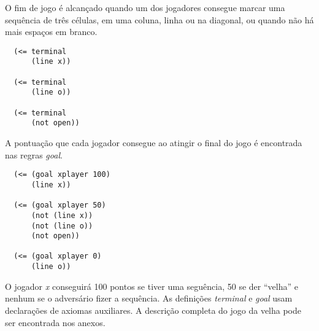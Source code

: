 O fim de jogo é alcançado quando um dos jogadores consegue marcar uma sequência
de três células, em uma coluna, linha ou na diagonal, ou quando não há mais
espaços em branco.
\begin{verbatim}
  (<= terminal
      (line x))

  (<= terminal
      (line o))

  (<= terminal
      (not open))
\end{verbatim}

A pontuação que cada jogador consegue ao atingir o final do jogo é encontrada
nas regras {\it goal}.
\begin{verbatim}
  (<= (goal xplayer 100)
      (line x))

  (<= (goal xplayer 50)
      (not (line x))
      (not (line o))
      (not open))

  (<= (goal xplayer 0)
      (line o))
\end{verbatim}
O jogador {\it x} conseguirá 100 pontos se tiver uma seguência, 50 se der
``velha'' e nenhum se o adversário fizer a sequência. As definições {\it terminal} 
e {\it goal} usam declarações de axiomas auxiliares. A descrição completa do
jogo da velha pode ser encontrada nos anexos.